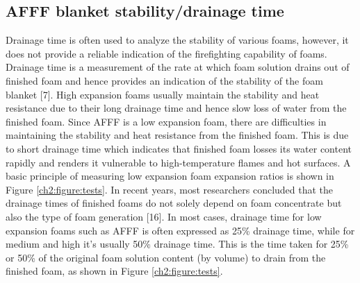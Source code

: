 \documentclass[12pt]{report}
\begin{document}
\subsection{AFFF blanket stability/drainage time}
Drainage time is often used to analyze the stability of various foams, however, it does not provide a reliable indication of the firefighting capability of foams. Drainage time is a measurement of the rate at which foam solution drains out of finished foam and hence provides an indication of the stability of the foam blanket [7]. High expansion foams usually maintain the stability and heat resistance due to their long drainage time and hence slow loss of water from the finished foam. 
Since AFFF is a low expansion foam, there are difficulties in maintaining the stability and heat resistance from the finished foam. This is due to short drainage time which indicates that finished foam losses its water content rapidly and renders it vulnerable to high-temperature flames and hot surfaces. A basic principle of measuring low expansion foam expansion ratios is shown in Figure \ref{ch2:figure:tests}. In recent years, most researchers concluded that the drainage times of finished foams do not solely depend on foam concentrate but also the type of foam generation [16]. In most cases, drainage time for low expansion foams such as AFFF is often expressed as 25\% drainage time, while for medium and high it’s usually 50\% drainage time. This is the time taken for 25\% or 50\% of the original foam solution content (by volume) to drain from the finished foam, as shown in Figure \ref{ch2:figure:tests}.
\end{document}
